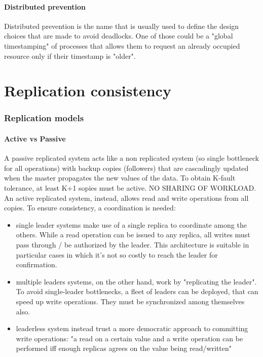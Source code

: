 \documentclass[10pt,a4paper]{article}
\begin{document}
			\subsection{Distributed prevention}
				Distributed prevention is the name that is usually used to define the design choices that are made to avoid deadlocks. One of those could be a "global timestamping" of processes that allows them to request an already occupied resource only if their timestamp is "older".
				
	\part{Replication consistency}
		\section{Replication models}
			\subsection{Active vs Passive}
				A passive replicated system acts like a non replicated system (so single bottleneck for all operations) with backup copies (followers) that are cascadingly updated when the master propagates the new values of the data. To obtain K-fault tolerance, at least K+1 sopies must be active. NO SHARING OF WORKLOAD.\\
				An active replicated system, instead, allows read and write operations from all copies. To ensure consistency, a coordination is needed:
				\begin{itemize}
					\item single leader systems make use of a single replica to coordinate among the others. While a read operation can be issued to any replica, all writes must pass through / be authorized by the leader. This architecture is suitable in particular cases in which it's not so costly to reach the leader for confirmation. 
					\item multiple leaders systems, on the other hand, work by "replicating the leader". To avoid single-leader bottlenecks, a fleet of leaders can be deployed, that can speed up write operations. They must be synchronized among themselves also. 
					\item leaderless system instead trust a more democratic approach to committing write operations: "a read on a certain value and a write operation can be performed iff enough replicas agrees on the value being read/written"
				\end{itemize}
			
\end{document}
